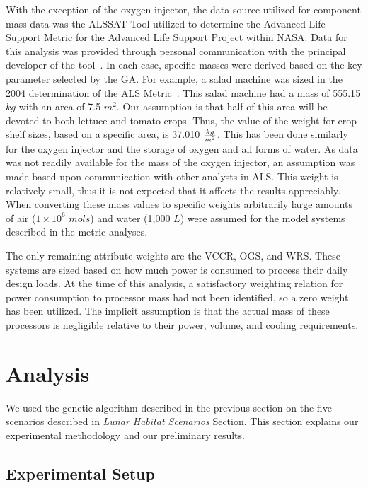 \documentclass[submit]{aiaa}
\begin{document}
With the exception of the oxygen injector, the data source utilized for component mass data was the ALSSAT Tool utilized to determine the Advanced Life Support Metric for the Advanced Life Support Project within NASA.
Data for this analysis was provided through personal communication with the principal developer of the tool~\cite{metric04, metric03, metric02}.
In each case, specific masses were derived based on the key parameter selected by the GA.
For example, a salad machine was sized in the 2004 determination of the ALS Metric~\cite{metric04}.
This salad machine had a mass of 555.15 $kg$ with an area of 7.5 $m^{2}$. 
Our assumption is that half of this area will be devoted to both lettuce and tomato crops.
Thus, the value of the weight for crop shelf sizes, based on a specific area, is 37.010 $kg \over m^{2}$.
This has been done similarly for the oxygen injector and the storage of oxygen and all forms of water.
As data was not readily available for the mass of the oxygen injector, an assumption was made based upon communication with other analysts in ALS. 
This weight is relatively small, thus it is not expected that it affects the results appreciably.
When converting these mass values to specific weights arbitrarily large amounts of air ($1\times 10^{6}$ $mols$) and water (1,000 $L$) were assumed for the model systems described in the metric analyses.

The only remaining attribute weights are the VCCR, OGS, and WRS. These systems are sized
based on how much power is consumed to process their daily design
loads. At the time of this analysis, a satisfactory weighting relation
for power consumption to processor mass had not been identified, so a
zero weight has been utilized. The  implicit assumption is that the
actual mass of these processors is negligible relative to their power,
volume, and cooling requirements.

\section{Analysis}
\label{sec:analysis}

We used the genetic algorithm described in the previous section on the
five scenarios described in \emph{Lunar Habitat Scenarios} Section. %
This section
explains our experimental methodology and our preliminary results.  

\subsection{Experimental Setup}
\end{document}
